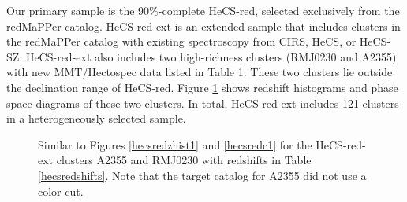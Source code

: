  

Our primary sample is the 90\%-complete HeCS-red, selected exclusively 
from the redMaPPer catalog.  HeCS-red-ext is an extended sample that 
includes clusters in the redMaPPer catalog  with existing spectroscopy from 
CIRS, HeCS, or HeCS-SZ.  HeCS-red-ext also 
includes two high-richness clusters (RMJ0230 and A2355) with new 
MMT/Hectospec data listed in Table 1. These two clusters lie outside the declination 
range of HeCS-red.  
Figure \ref{hecsredext} shows redshift histograms and phase space diagrams of these two clusters. 
In total, HeCS-red-ext includes 121 clusters in a heterogeneously selected sample.

\begin{figure*} 
\caption{\label{hecsredc1} {Redshift (rest-frame clustrocentric velocity) versus projected radius for galaxies around
HeCS-red clusters.  The caustic
pattern is evident as the trumpet-shaped regions with high density.
The solid lines indicate our estimate of the location of the caustics
in each cluster.  Clusters are ordered left-to-right and top-to-bottom
by decreasing richness parameter $\lambda$.  }}
\end{figure*}



\begin{figure*} 
\caption{\label{hecsredc2} {Same as Figure \ref{hecsredc1}.   }}
\end{figure*}


\begin{figure} 
\caption{\label{hecsredext} Similar to Figures \ref{hecsredzhist1} and \ref{hecsredc1} for the 
HeCS-red-ext clusters A2355 and RMJ0230 with redshifts in Table \ref{hecsredshifts}. Note that the target catalog 
for A2355 did not use a color cut.
}
\end{figure}






